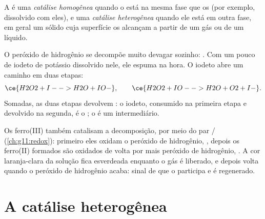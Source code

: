 \begin{definition}\label{def:g12:catalysis:homogeneous}
A  é uma \emph{catálise homogênea}
quando o  está na mesma fase que os  (por exemplo,
dissolvido com eles), e uma \emph{catálise
heterogênea} quando ele está em outra fase,
em geral um sólido cuja superfície os  alcançam a partir de um
gás ou de um líquido.
\end{definition}

\begin{example}\label{ex:g12:catalysis:iodide}
O peróxido de hidrogênio se decompõe muito devagar sozinho:
. Com um pouco de iodeto de potássio dissolvido
nele, ele espuma na hora. O  iodeto abre um caminho em duas etapas:
\[
  \ce{H2O2 + I- -> H2O + IO-}, \qquad
  \ce{H2O2 + IO- -> H2O + O2 + I-} .
\]
Somadas, as duas etapas devolvem : o  iodeto,
consumido na primeira etapa e devolvido na segunda, é o ; o
  é um intermediário.
\end{example}


\begin{example}\label{ex:g12:catalysis:iron}
Os  ferro(III) também catalisam a decomposição, por meio do par
/ (\cref{ch:g11:redox}): primeiro eles oxidam o
peróxido de hidrogênio, ,
depois os  ferro(II) formados são oxidados de volta por mais
peróxido de hidrogênio, . A
cor laranja-clara da solução fica esverdeada enquanto o gás é liberado,
e depois volta quando o peróxido de hidrogênio acaba: sinal de que o
 participa e é regenerado.
\end{example}

\section{A catálise heterogênea}

